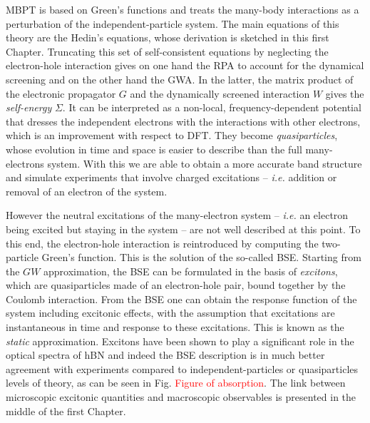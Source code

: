 \acrshort{MBPT} is based on Green's functions and treats the many-body interactions as a perturbation of the independent-particle system. The main equations of this theory are the Hedin's equations, whose derivation is sketched in this first Chapter. Truncating this set of self-consistent equations by neglecting the electron-hole interaction gives on one hand the \acrfull{RPA} to account for the dynamical screening and on the other hand the \acrfull{GWA}. In the latter, the matrix product of the electronic propagator $G$ and the dynamically screened interaction $W$ gives the \textit{self-energy} $\Sigma$. It can be interpreted as a non-local, frequency-dependent potential that dresses the independent electrons with the interactions with other electrons, which is an improvement with respect to \acrshort{DFT}. They become \textit{quasiparticles}, whose evolution in time and space is easier to describe than the full many-electrons system.
With this we are able to obtain a more accurate band structure and simulate experiments that involve charged excitations -- \textit{i.e.} addition or removal of an electron of the system. 

However the neutral excitations of the many-electron system -- \textit{i.e.} an electron being excited but staying in the system -- are not well described at this point. To this end, the electron-hole interaction is reintroduced by computing the two-particle Green's function. This is the solution of the so-called \acrfull{BSE}. Starting from the $GW$ approximation, the \acrshort{BSE} can be formulated in the basis of \textit{excitons}, which are quasiparticles made of an electron-hole pair, bound together by the Coulomb interaction. From the \acrshort{BSE} one can obtain the response function of the system including excitonic effects, with the assumption that excitations are instantaneous in time and response to these excitations. This is known as the \textit{static} approximation. Excitons have been shown to play a significant role in the optical spectra of \acrshort{hBN} and indeed the \acrshort{BSE} description is in much better agreement with experiments compared to independent-particles or quasiparticles levels of theory, as can be seen in Fig. \textcolor{red}{Figure of absorption}. The link between microscopic excitonic quantities and macroscopic observables is presented in the middle of the first Chapter. 

